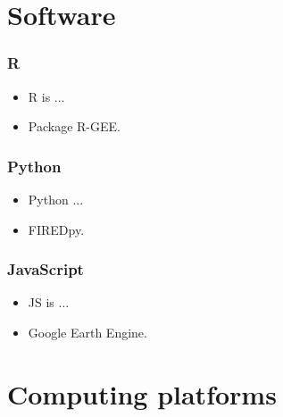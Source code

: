 \documentclass{beamer}
\begin{document}
\section{Software}

\begin{frame}
    \frametitle{R}
    \begin{itemize}
        \item R is ...
        \item Package R-GEE.
    \end{itemize}
\end{frame}

\begin{frame}
    \frametitle{Python}
    \begin{itemize}
        \item Python ...
        \item FIREDpy.
    \end{itemize}
\end{frame}

\begin{frame}
    \frametitle{JavaScript}
    \begin{itemize}
        \item JS is ...
        \item Google Earth Engine.
    \end{itemize}
\end{frame}



\section{Computing platforms}
\end{document}
